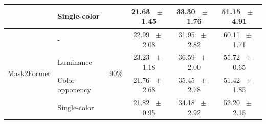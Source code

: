 \begin{table}[h]
\begin{tabular}{@{}l l c c c c@{}}
    & Single-color &  & 21.63 ~$\pm$~ 1.45 & 33.30 ~$\pm$~ 1.76 & 51.15 ~$\pm$~ 4.91 \\
    \midrule
    \multirow{4}{*}{Mask2Former} & - & \multirow{4}{*}{90\%} & 22.99 ~$\pm$~ 2.08 & 31.95 ~$\pm$~ 2.82 & 60.11 ~$\pm$~ 1.71 \\
    & Luminance &  & 23.23 ~$\pm$~ 1.18 & 36.59 ~$\pm$~ 2.00 & 55.72 ~$\pm$~ 0.65 \\
    & Color-opponency &  & 21.76 ~$\pm$~ 2.68 & 35.45 ~$\pm$~ 2.78 & 51.42 ~$\pm$~ 1.85 \\
    & Single-color &  & 21.82 ~$\pm$~ 0.95 & 34.18 ~$\pm$~ 2.92 & 52.20 ~$\pm$~ 2.15 \\
    \midrule
    \bottomrule
  \end{tabular}
  \label{tab:mask2former_acdc_night}
\end{table}